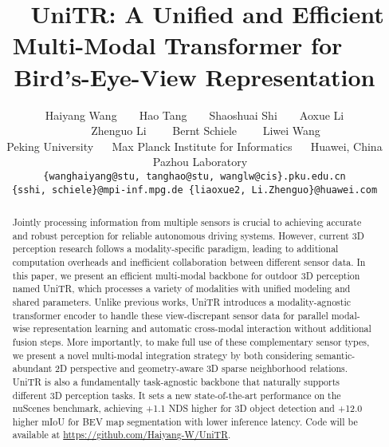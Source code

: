 \documentclass[10pt,twocolumn,letterpaper]{article}
\begin{document}
\title{~~UniTR: A Unified and Efficient Multi-Modal Transformer for ~~ Bird's-Eye-View Representation}

\author{
Haiyang Wang\footnotemark[1] ~~~~Hao Tang\footnotemark[1] ~~~~Shaoshuai Shi\footnotemark[2] ~~~~Aoxue Li  \\
~~~~Zhenguo Li  ~~~~Bernt Schiele  ~~~~Liwei Wang\footnotemark[2]   \\
{\normalsize{\hspace*{-14pt}}
}
{\normalsize
{}Peking University ~~ {}Max Planck Institute for Informatics ~~ {}Huawei, China ~~{}Pazhou Laboratory}\\
{\normalsize{\hspace*{-18pt}}
}
{\tt\small \{wanghaiyang@stu, tanghao@stu, wanglw@cis\}.pku.edu.cn}\\
{\tt\small \{sshi, schiele\}@mpi-inf.mpg.de  \{liaoxue2, Li.Zhenguo\}@huawei.com}
}

\maketitle
\renewcommand{\thefootnote}{\fnsymbol{footnote}}
\ificcvfinal\thispagestyle{empty}\fi


\begin{abstract}
Jointly processing information from multiple sensors is crucial to achieving accurate and robust perception for reliable autonomous driving systems. However, current 3D perception research follows a modality-specific paradigm, leading to additional computation overheads and inefficient collaboration between different sensor data. In this paper, we present an efficient multi-modal backbone for outdoor 3D perception named UniTR, which processes a variety of modalities with unified modeling and shared parameters. Unlike previous works, UniTR introduces a modality-agnostic transformer encoder to handle these view-discrepant sensor data for parallel modal-wise representation learning and automatic cross-modal interaction without additional fusion steps. More importantly, to make full use of these complementary sensor types, we present a novel multi-modal integration strategy by both considering semantic-abundant 2D perspective and geometry-aware 3D sparse neighborhood relations. UniTR is also a fundamentally task-agnostic backbone that naturally supports different 3D perception tasks. It sets a new state-of-the-art performance on the nuScenes benchmark, achieving +1.1 NDS higher for 3D object detection and +12.0 higher mIoU for BEV map segmentation with lower inference latency. Code will be available at \url{https://github.com/Haiyang-W/UniTR}.

\end{abstract}
\end{document}
